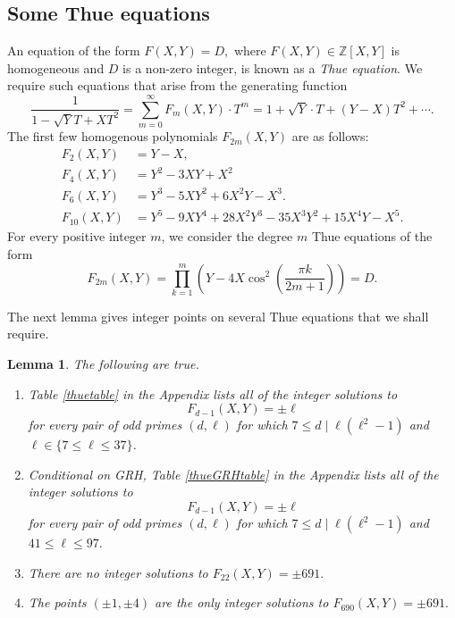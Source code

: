 \documentclass[12pt]{amsart}
\newtheorem{lem}{Lemma}[section]
\newcommand{\Z}{\mathbb{Z}}
\newcommand{\?}{\color{red}?}
\numberwithin{equation}{section}
\begin{document}
\subsection{Some Thue equations}
An equation of the form
$F(X,Y)=D,
$
where $F(X,Y)\in \Z[X,Y]$ is homogeneous and $D$ is a non-zero integer, is known as a {\it Thue equation}.
We require such equations that arise
from the generating function
\begin{equation}\label{genfunction}
\frac{1}{1-\sqrt{Y}T+XT^2}=\sum_{m=0}^{\infty}F_m(X,Y)\cdot T^{m}=1+\sqrt{Y}\cdot T+(Y-X)T^2+\cdots.
\end{equation}
The first few homogenous polynomials $F_{2m}(X,Y)$ are as follows:
\begin{displaymath}
\begin{split}
F_2(X,Y)&=Y-X,\\
F_4(X,Y)&=Y^2-3XY+X^2\\
F_6(X,Y)&=Y^3-5XY^2+6X^2Y-X^3.\\
F_{10}(X,Y)&=Y^5-9XY^4+28X^2Y^3-35X^3Y^2+15X^4Y-X^5.%
\end{split}
\end{displaymath}
For every positive integer $m$, we consider the degree $m$ Thue equations of the form
\begin{equation}\label{ThueEqn}
F_{2m}(X,Y)=\prod_{k=1}^m \left(Y-4X \cos^2\left(\frac{\pi k}{2m+1}\right)\right)=D.
\end{equation}

The next lemma gives integer points on several Thue equations that 
we shall require.

\begin{lem}\label{Monster} The following are true.
\begin{enumerate}
\item
Table \ref{thuetable} in the Appendix lists all of the integer solutions to
$$F_{d-1}(X,Y)=\pm\ell
$$
for every pair of odd primes $(d,\ell)$ for which $7\leq d\mid \ell(\ell^2-1)$ and $\ell \in \{ 7\leq \ell \leq 37\}$.
\item Conditional on GRH, Table \ref{thueGRHtable} in the Appendix lists all of the integer solutions to
$$
F_{d-1}(X,Y)=\pm\ell
$$
for every pair of odd primes $(d,\ell)$ for which $7\leq d\mid \ell(\ell^2-1)$ and $41\leq \ell \leq 97.$
\item There are no integer solutions to
$F_{22}(X,Y)=\pm 691.$
\item The points $(\pm 1, \pm 4)$ are the only integer solutions to
$F_{690}(X,Y)=\pm 691.$
\end{enumerate}
\end{lem}
\end{document}
